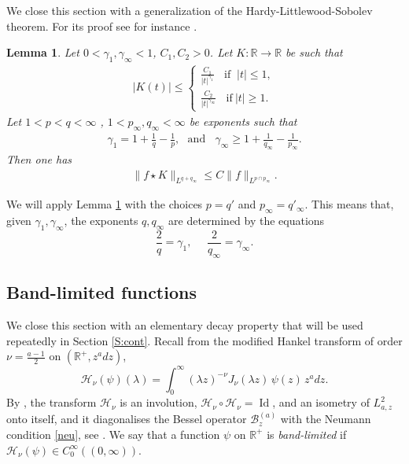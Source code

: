 \documentclass[11pt,letter]{amsart}
\def \R {\mathbb{R}}
\newcommand{\Ba}{\mathscr B_z^{(a)}}
\newcommand{\la}{\lambda}
\numberwithin{equation}{section}
\newtheorem{lemma}[theorem]{Lemma}
\numberwithin{equation}{section}
\begin{document}
 We close this section with a generalization of the Hardy-Littlewood-Sobolev theorem. For its proof see for instance \cite[Lemma 5.1]{BG}. 

\begin{lemma}\label{L:HLS}
Let $0<\gamma_{1}, \gamma_\infty <1$, $C_1,C_2>0$. Let $K:\mathbb{R}\to \mathbb{R}$ be such that
\begin{align*}
|K(t)|\le \begin{cases}
\frac{C_1}{|t|^{\gamma_{1}}} \ \ \ \ \text{if }\ |t|\le 1,
\\
\frac{C_2}{|t|^{\gamma_{\infty}}} \ \ \ \ \text{if}\ |t|\ge1.
\end{cases}
\end{align*}
Let $1<p<q<\infty$ , $1< p_{\infty}, q_{\infty} <\infty$ be exponents such that
\begin{align*}
\gamma_{1}=1+\frac{1}{q}-\frac{1}{p}, \ \ \ \text{and}\ \ \ \ \gamma_{\infty}\ge1+\frac{1}{q_{\infty}}-\frac{1}{p_{\infty}}.
\end{align*}  
Then one has
\begin{align}\label{meglio}
\|f\star K\|_{L^{q+q_\infty}}\le C \|f\|_{L^{p\cap p_{\infty}}}.
\end{align}
\end{lemma}

We will apply Lemma \ref{L:HLS} with the choices $p = q'$ and $p_\infty = q'_\infty$. This means that, given $\gamma_1, \gamma_\infty$, the exponents $q, q_\infty$ are determined by the equations
\begin{equation}\label{qq}
\frac 2{q} = \gamma_1,\ \ \ \ \ \ \frac 2{q_\infty} = \gamma_\infty.
\end{equation}

\vskip 0.2in

\subsection{Band-limited functions}\label{S:band}

We close this section with an elementary decay property that will be used repeatedly in Section \ref{S:cont}. Recall from \cite[(2.3)]{GS} the modified Hankel transform of order $\nu = \frac{a-1}2$ on $(\R^+, z^a dz)$,
\[
\mathcal H_{\nu}(\psi)(\la) = \int_0^\infty (\la z)^{-\nu} J_{\nu}(\la z)\, \psi(z)\, z^a dz.
\]
By \cite[Theorem 2.1 \& (2.7)]{GS}, the transform $\mathcal H_\nu$ is an involution, $\mathcal H_\nu\circ \mathcal H_\nu = \operatorname{Id}$, and an isometry of $L^2_{a,z}$ onto itself, and it diagonalises the Bessel operator $\Ba$ with the Neumann condition \eqref{neu}, see \cite[Theorem 2.2]{GS}. We say that a function $\psi$ on $\R^+$ is \emph{band-limited} if $\mathcal H_{\nu}(\psi)\in C_0^\infty((0,\infty))$.
\end{document}
